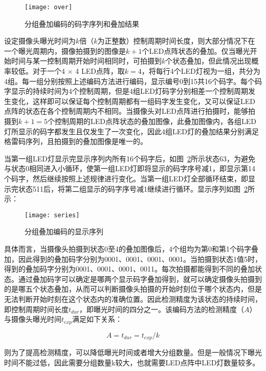 \begin{figure}[h] 
  \centering
  \texttt{[image: over]}
  \caption{分组叠加编码的码字序列和叠加结果}
  \label{over}
\end{figure}

设定摄像头曝光时间为$k$倍（$k$为正整数）控制周期时间长度，则大部分情况下在一个曝光周期内，摄像拍摄到的图像是$k + 1$个LED点阵状态的叠加。仅当曝光开始时间与某一控制周期开始时间相同时，可拍摄到$k$个状态叠加，但此情况出现概率较低。对于一个4 × 4 LED点阵，取$k = 4$，将每行4个LED灯视为一组，共分为4组。每一组分别按照上述编码方法进行编码，显示编号0到15共16个码字。每个码字显示的持续时间为4个控制周期，但是4组LED灯码字分别相差一个控制周期发生变化，这样即可以保证每个控制周期都有一组码字发生变化，又可以保证LED点阵的状态在各个控制周期内不相同。当摄像头对LED点阵进行拍摄时，能够拍摄到$k + 1 = 5$个控制周期的LED点阵状态的叠加图像，此叠加图像内，各组LED灯所显示的码字都发生且仅发生了一次变化，因此4组LED灯的叠加结果分别满足格雷码序列，且拍摄到的叠加图像是唯一的。

当第一组LED灯显示完显示序列内所有16个码字后，如图~\ref{series}所示状态63，为避免与状态0相同进入小循环，使第一组LED灯即将显示的码字序号减1，即显示第14个码字，然后继续按照上述规律进行变化。当第一组LED灯全部循环结束，即显示完状态511后，将第二组显示的码字序号减1继续进行循环。显示序列如图~\ref{series}所示：

\begin{figure}[h] 
  \centering
  \texttt{[image: series]}
  \caption{分组叠加编码的显示序列}
  \label{series}
\end{figure}

具体而言，当摄像头拍摄到状态0至4的叠加图像后，4个组均为第0和第1个码字叠加，因此得到的叠加码字分别为0001、0001、0001、0001。当拍摄到状态1值5时，得到的叠加码字分别为0001、0001、0001、0011。每次拍摄都能得到不同的叠加状态。通过叠加码字可以确定是哪两个显示码字叠加得到，就可以确定摄像头拍摄到的是哪五个状态叠加，从而可以判断摄像头拍摄的开始时刻位于哪个状态内，但是无法判断开始时刻在这个状态内的准确位置。因此检测精度为该状态的持续时间，即控制周期时间长度$t_{dur}$，即曝光时间的四分之一。该编码方法的检测精度（$A$）与摄像头曝光时间$t_{exp}$满足如下关系：

\begin{equation}
A = t_{dur} = t_{exp} / k
\end{equation}

则为了提高检测精度，可以降低曝光时间或者增大分组数量。但是一般情况下曝光时间不能过低，因此需要分组数量k较大，也就需要LED点阵中LED灯数量较多。

